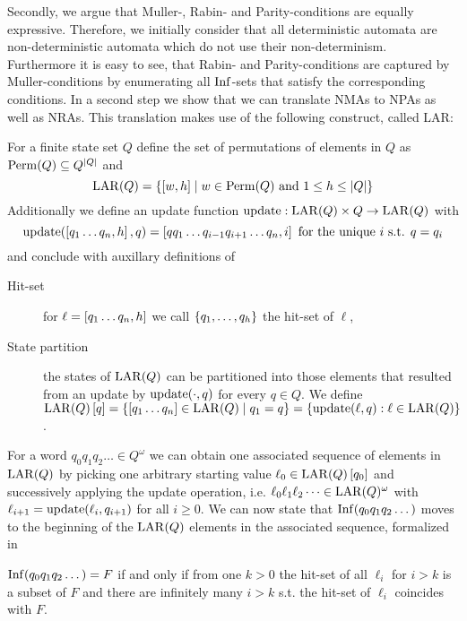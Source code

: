 Secondly, we argue that Muller-, Rabin- and Parity-conditions are
equally expressive. Therefore, we initially consider that all deterministic
automata are non-deterministic automata which do not use their
non-determinism. Furthermore it is easy to see, that Rabin- and
Parity-conditions are captured by Muller-conditions by enumerating all
$\operatorname{Inf}$-sets that satisfy the corresponding conditions. In a second step we
show that we can translate \acp{NMA} to \acp{NPA} as well as \acp{NRA}. This
translation makes use of the following construct, called \ac{LAR}:
\begin{definition}
  For a finite state set $Q$ define the set of permutations of elements in
  $Q$ as $\operatorname{Perm}(Q)\subseteq Q^{\left\vert{Q}\right\vert}$ and
  \begin{equation*}
    \operatorname{LAR}(Q) = \left\{\left[w,h\right]\mid w\in\operatorname{Perm}(Q)\text{ and }1\leq
    h\leq\left\vert{Q}\right\vert\right\}
  \end{equation*}
  Additionally we define an update function
  $\operatorname{update}:\operatorname{LAR}(Q)\times Q\rightarrow\operatorname{LAR}(Q)$ with
  \begin{equation*}
    \operatorname{update}(\left[q_{1}\dots q_{n},h\right], q)
    = \left[qq_{1}\dots q_{i-1}q_{i+1}\dots q_{n},i\right]
    \text{ for the unique }i\text{ s.t. }q=q_{i}
  \end{equation*}
  and conclude with auxillary definitions of
  \begin{description}
    \item [Hit-set] for $\ell = \left[q_{1}\dots q_{n},h\right]$ we call
      $\left\{q_{1},\dots,q_{h}\right\}$ the hit-set of $\ell$,
    \item [State partition] the states of $\operatorname{LAR}(Q)$ can be partitioned into
      those elements that resulted from an update by $\operatorname{update}(\cdot, q)$ for
      every $q\in Q$. We define
      $\operatorname{LAR}(Q)\left[q\right] = \left\{\left[q_{1}\dots q_{n}\right]\in\operatorname{LAR}(Q)\mid
        q_{1} = q\right\} = \left\{\operatorname{update}(\ell, q):\ell\in\operatorname{LAR}(Q)\right\}$.
  \end{description}
\end{definition}
For a word $q_{0}q_{1}q_{2}\dots\in Q^{\omega}$ we can obtain one associated
sequence of elements in $\operatorname{LAR}(Q)$ by picking one arbitrary starting value
$\ell_{0}\in\operatorname{LAR}(Q)\left[q_{0}\right]$ and successively applying the update
operation, i.e. $\ell_{0}\ell_{1}\ell_{2}\dots\in\operatorname{LAR}(Q)^{\omega}$ with
$\ell_{i+1} = \operatorname{update}(\ell_{i},q_{i+1})$ for all $i\geq 0$. We can now state that
$\operatorname{Inf}(q_{0}q_{1}q_{2}\dots)$ moves to the beginning of the $\operatorname{LAR}(Q)$ elements 
in the associated sequence, formalized in
\begin{lemma}
  \cite[Lemma 1.21]{AutoLogInfGames}
  $\operatorname{Inf}(q_{0}q_{1}q_{2}\dots) = F$ if and only if from one $k>0$ the hit-set 
  of all $\ell_{i}$ for $i>k$ is a subset of $F$ and there are infinitely 
  many $i>k$ s.t. the hit-set of $\ell_{i}$ coincides with $F$.
  \label{lem:larhitset}
\end{lemma}
